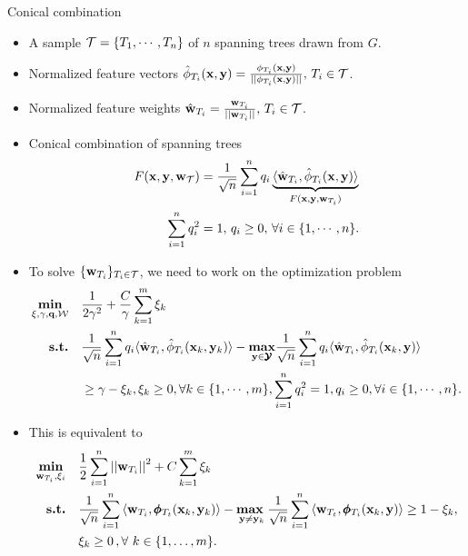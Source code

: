 \documentclass[first=dgreen,second=purple,logo=yellowexc]{aaltoslides}
\begin{document}
%
\begin{frame}[allowframebreaks]{Conical combination}
	\begin{itemize}\footnotesize
		\item A sample $\mathcal{T}=\{T_1,\cdots,T_n\}$ of $n$ spanning trees drawn from $G$.
		\item Normalized feature vectors $\hat{\phi}_{T_i}(\mathbf {x},\mathbf {y})=\frac{\phi_{T_i}(\mathbf {x},\mathbf {y})}{||\phi_{T_i}(\mathbf {x},\mathbf {y})||}, \, T_i\in\mathcal{T}$.
		\item Normalized feature weights $\hat{\mathbf {w}}_{T_i}=\frac{\mathbf {w}_{T_i}}{||\mathbf {w}_{T_i}||}, \, T_i\in\mathcal{T}$.
		\item Conical combination of spanning trees
		\begin{align*}
			F(\mathbf {x},\mathbf {y},\mathbf {w}_{\mathcal{T}}) &= \frac{1}{\sqrt{n}}\sum_{i=1}^{n}q_i\underbrace{\langle \hat{\mathbf {w}}_{T_i}, \hat{\phi}_{T_i}(\mathbf {x},\mathbf {y}) \rangle}_{F(\mathbf {x},\mathbf {y},\mathbf {w}_{T_i})}\\
			\sum_{i=1}^{n}q_i^2 &= 1,\, q_i \ge 0,\, \forall i\in\{1,\cdots,n\}.
		\end{align*}
		\item To solve $\{\mathbf {w}_{T_i}\}_{T_i\in\mathcal{T}}$, we need to work on the optimization problem
		\begin{align*}
			\underset{\mathbf{\xi},\gamma,\mathbf {q},\mathcal{W}}{\textbf{min}} \quad& \frac{1}{2\gamma^2} + \frac{C}{\gamma}\sum_{k=1}^m\xi_k\\
			\textbf{s.t.} \quad& \frac{1}{\sqrt{n}}\sum_{i=1}^{n}q_i\langle \hat{\mathbf {w}}_{T_i}, \hat{\phi}_{T_i}(\mathbf {x}_k,\mathbf {y}_k) \rangle -\underset{\mathbf {y}\in\pmb {\mathcal{Y}}}{\textbf{max}}\frac{1}{\sqrt{n}}\sum_{i=1}^{n}q_i\langle \hat{\mathbf {w}}_{T_i}, \hat{\phi}_{T_i}(\mathbf {x}_k,\mathbf {y}) \rangle\\
			&\ge \gamma-\xi_k, \xi_k\ge 0,\forall k\in\{1,\cdots,m\},\sum_{i=1}^nq_i^2=1,q_i\ge0,\forall i\in\{1,\cdots,n\}.
		\end{align*}
		\item This is equivalent to
		\begin{align*}
			\underset{\mathbf {w}_{T_i},\xi_i}{\textbf{min}} & \quad \frac{1}{2}\sum_{i=1}^{n}\left|\left| \mathbf {w}_{T_i} \right|\right|^2 + C\sum_{k=1}^{m}\xi_k\\
			\textbf{s.t.} & \quad \frac{1}{\sqrt{n}}\sum_{i=1}^{n}{ \langle \mathbf {w}_{T_i}, \pmb \phi_{T_t}(\mathbf {x}_k,\mathbf {y}_k) \rangle} - \underset{\mathbf {y} \neq \mathbf {y}_k}{\textbf{max}\ } \frac{1}{\sqrt{n}}\sum_{i=1}^{n}{\langle \mathbf {w}_{T_t}, \pmb \phi_{T_i}(\mathbf {x}_k,\mathbf {y}) \rangle } \geq 1 -  \xi_k, \\
			& \quad \xi_k\ge0\, , \forall\ k \in \{ 1,\dots,m \}.
		\end{align*}
	\end{itemize}
\end{frame}
\end{document}
